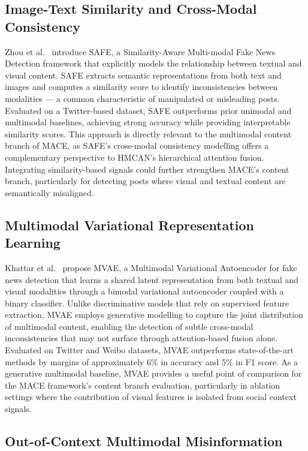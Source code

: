 \subsection{Image-Text Similarity and Cross-Modal Consistency}

Zhou et al.\ \cite{Zhou2020} introduce SAFE, a Similarity-Aware Multi-modal Fake News Detection framework that explicitly models the relationship between textual and visual content. SAFE extracts semantic representations from both text and images and computes a similarity score to identify inconsistencies between modalities — a common characteristic of manipulated or misleading posts. Evaluated on a Twitter-based dataset, SAFE outperforms prior unimodal and multimodal baselines, achieving strong accuracy while providing interpretable similarity scores. This approach is directly relevant to the multimodal content branch of MACE, as SAFE's cross-modal consistency modelling offers a complementary perspective to HMCAN's hierarchical attention fusion. Integrating similarity-based signals could further strengthen MACE's content branch, particularly for detecting posts where visual and textual content are semantically misaligned.

\subsection{Multimodal Variational Representation Learning}

Khattar et al.\ \cite{Khattar2019} propose MVAE, a Multimodal Variational Autoencoder for fake news detection that learns a shared latent representation from both textual and visual modalities through a bimodal variational autoencoder coupled with a binary classifier. Unlike discriminative models that rely on supervised feature extraction, MVAE employs generative modelling to capture the joint distribution of multimodal content, enabling the detection of subtle cross-modal inconsistencies that may not surface through attention-based fusion alone. Evaluated on Twitter and Weibo datasets, MVAE outperforms state-of-the-art methods by margins of approximately 6\% in accuracy and 5\% in F1 score. As a generative multimodal baseline, MVAE provides a useful point of comparison for the MACE framework's content branch evaluation, particularly in ablation settings where the contribution of visual features is isolated from social context signals.

\subsection{Out-of-Context Multimodal Misinformation}


